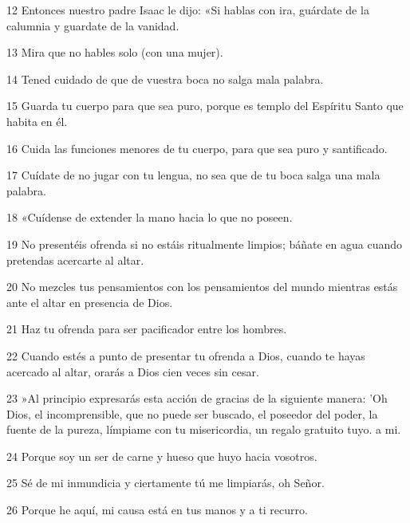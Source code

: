 \par 12 Entonces nuestro padre Isaac le dijo: «Si hablas con ira, guárdate de la calumnia y guardate de la vanidad.

\par 13 Mira que no hables solo (con una mujer).

\par 14 Tened cuidado de que de vuestra boca no salga mala palabra.

\par 15 Guarda tu cuerpo para que sea puro, porque es templo del Espíritu Santo que habita en él.

\par 16 Cuida las funciones menores de tu cuerpo, para que sea puro y santificado.

\par 17 Cuídate de no jugar con tu lengua, no sea que de tu boca salga una mala palabra.

\par 18 «Cuídense de extender la mano hacia lo que no poseen.

\par 19 No presentéis ofrenda si no estáis ritualmente limpios; báñate en agua cuando pretendas acercarte al altar.

\par 20 No mezcles tus pensamientos con los pensamientos del mundo mientras estás ante el altar en presencia de Dios.

\par 21 Haz tu ofrenda para ser pacificador entre los hombres.

\par 22 Cuando estés a punto de presentar tu ofrenda a Dios, cuando te hayas acercado al altar, orarás a Dios cien veces sin cesar.

\par 23 »Al principio expresarás esta acción de gracias de la siguiente manera: 'Oh Dios, el incomprensible, que no puede ser buscado, el poseedor del poder, la fuente de la pureza, límpiame con tu misericordia, un regalo gratuito tuyo. a mi.

\par 24 Porque soy un ser de carne y hueso que huyo hacia vosotros.

\par 25 Sé de mi inmundicia y ciertamente tú me limpiarás, oh Señor.

\par 26 Porque he aquí, mi causa está en tus manos y a ti recurro.

